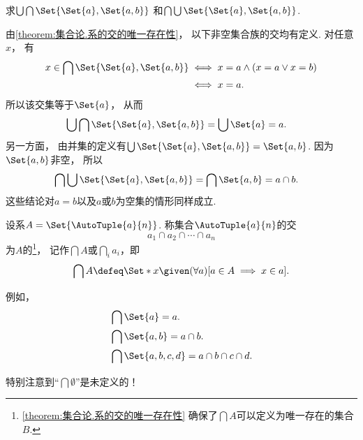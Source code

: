 \begin{example}
    求\(\bigcup\bigcap\Set{\Set{a},\Set{a,b}}\)
    和\(\bigcap\bigcup\Set{\Set{a},\Set{a,b}}\).
    \begin{solution}
        由\cref{theorem:集合论.系的交的唯一存在性}，
        以下非空集合族的交均有定义.
        对任意\(x\)，
        有
        \begin{align*}
            x\in\bigcap\Set{\Set{a},\Set{a,b}}
            &\iff x=a\land(x=a\lor x=b) \\
            &\iff x=a.
        \end{align*}
        所以该交集等于\(\Set{a}\)，
        从而
        \begin{align*}
            \bigcup\bigcap\Set{\Set{a},\Set{a,b}}
            &= \bigcup\Set{a}=a.
        \end{align*}
        另一方面，
        由并集的定义有\(\bigcup\Set{\Set{a},\Set{a,b}}=\Set{a,b}\).
        因为\(\Set{a,b}\)非空，
        所以
        \begin{align*}
            \bigcap\bigcup\Set{\Set{a},\Set{a,b}}
            &= \bigcap\Set{a,b}=a\cap b.
        \end{align*}
        这些结论对\(a=b\)以及\(a\)或\(b\)为空集的情形同样成立.
    \end{solution}
\end{example}

\begin{definition}
设系\(A = \Set{\AutoTuple{a}{n}}\).
称集合\(\AutoTuple{a}{n}\)的交\begin{equation*}
	a_1 \cap a_2 \cap \dotsb \cap a_n
\end{equation*}为\(A\)的\footnote{%
\cref{theorem:集合论.系的交的唯一存在性} 确保了\(\bigcap A\)可以定义为唯一存在的集合\(B\).
}，
记作\(\bigcap A\)或\(\bigcap_i a_i\)，即\begin{equation*}
	\bigcap A
	\defeq
	\Set*{ x \given (\forall a)[a \in A \implies x \in a] }.
\end{equation*}
\end{definition}

例如，
\begin{align*}
	&\bigcap\Set{a} = a. \\
	&\bigcap\Set{a,b} = a \cap b. \\
	&\bigcap\Set{a,b,c,d} = a \cap b \cap c \cap d.
\end{align*}

\begin{remark}
特别注意到“\(\bigcap\emptyset\)”是未定义的！
\end{remark}

